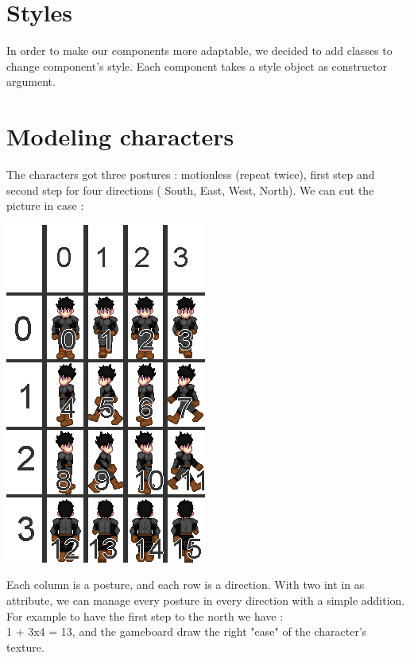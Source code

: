 \documentclass{scrreprt}
\begin{document}
	\section{Styles}
	In order to make our components more adaptable, we decided to add classes to change component's style. Each component takes a style object as constructor argument. 
	\section{Modeling characters}
	The characters got three postures : motionless (repeat twice), first step and second step for four directions ( South, East, West, North). We can cut the picture in case : 
	\begin{center}
	\includegraphics[scale=0.4]{char.png}
	\end{center}
	Each column is a posture, and each row is a direction. With two int in as attribute, we can manage every posture in every direction with a simple addition. For example to have the first step to the north we have :\\
		1 + 3x4 = 13, and the gameboard draw the right "case" of the character's texture.
\end{document}
